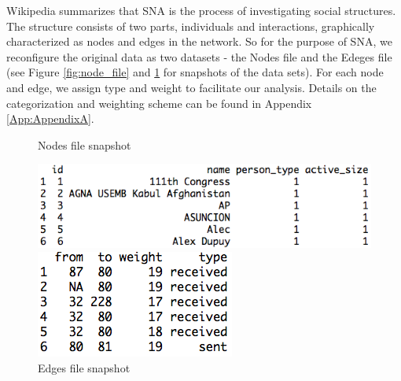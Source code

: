 Wikipedia summarizes that SNA  is the process of investigating social structures\cite{wiki_sna}. The structure consists of two parts, individuals and interactions, graphically characterized as nodes and edges in the network. So for the purpose of SNA, we reconfigure the original data as two datasets - the Nodes file and the Edeges file (see Figure \ref{fig:node_file} and \ref{fig:edge_file} for snapshots of the data sets). For each node and edge, we assign type and weight to facilitate our analysis. Details on the categorization and weighting scheme can be found in Appendix \ref{App:AppendixA}.
\begin{figure}[ht]
\caption{Nodes file snapshot}
\label{fig:node_file}
\centering
\includegraphics[width=.68\textwidth]{report_node_file}

\caption{Edges file snapshot}
\label{fig:edge_file}
\centering
\includegraphics[width=.35\textwidth]{report_edge_file}
\end{figure}
